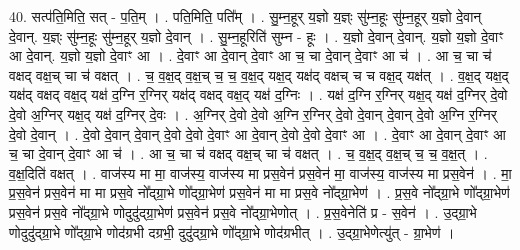 \documentclass[17pt]{extarticle}
\begin{document}
40. सत्प॑ति॒मिति॒ सत् - प॒ति॒म् । . पति॒मिति॒ पति᳚म् । . सु॒म्न॒हूर् य॒ज्ञो य॒ज्ञ्ः सु॑म्न॒हूः सु॑म्न॒हूर् य॒ज्ञो दे॒वान् दे॒वान्. य॒ज्ञ्ः सु॑म्न॒हूः सु॑म्न॒हूर् य॒ज्ञो दे॒वान् । . सु॒म्न॒हूरिति॑ सुम्न - हूः । . य॒ज्ञो दे॒वान् दे॒वान्. य॒ज्ञो य॒ज्ञो दे॒वाꣳ आ दे॒वान्. य॒ज्ञो य॒ज्ञो दे॒वाꣳ आ । . दे॒वाꣳ आ दे॒वान् दे॒वाꣳ आ च॒ चा दे॒वान् दे॒वाꣳ आ च॑ । . आ च॒ चा च॑ वक्षद् वक्ष॒च् चा च॑ वक्षत् । . च॒ व॒क्ष॒द् व॒क्ष॒च् च॒ च॒ व॒क्ष॒द् यक्ष॒द् यक्ष॑द् वक्षच् च च वक्ष॒द् यक्ष॑त् । . व॒क्ष॒द् यक्ष॒द् यक्ष॑द् वक्षद् वक्ष॒द् यक्ष॑ द॒ग्नि र॒ग्निर् यक्ष॑द् वक्षद् वक्ष॒द् यक्ष॑ द॒ग्निः । . यक्ष॑ द॒ग्नि र॒ग्निर् यक्ष॒द् यक्ष॑ द॒ग्निर् दे॒वो दे॒वो अ॒ग्निर् यक्ष॒द् यक्ष॑ द॒ग्निर् दे॒वः । . अ॒ग्निर् दे॒वो दे॒वो अ॒ग्नि र॒ग्निर् दे॒वो दे॒वान् दे॒वान् दे॒वो अ॒ग्नि र॒ग्निर् दे॒वो दे॒वान् । . दे॒वो दे॒वान् दे॒वान् दे॒वो दे॒वो दे॒वाꣳ आ दे॒वान् दे॒वो दे॒वो दे॒वाꣳ आ । . दे॒वाꣳ आ दे॒वान् दे॒वाꣳ आ च॒ चा दे॒वान् दे॒वाꣳ आ च॑ । . आ च॒ चा च॑ वक्षद् वक्ष॒च् चा च॑ वक्षत् । . च॒ व॒क्ष॒द् व॒क्ष॒च् च॒ च॒ व॒क्ष॒त् । . व॒क्ष॒दिति॑ वक्षत् । . वाज॑स्य मा मा॒ वाज॑स्य॒ वाज॑स्य मा प्रस॒वेन॑ प्रस॒वेन॑ मा॒ वाज॑स्य॒ वाज॑स्य मा प्रस॒वेन॑ । . मा॒ प्र॒स॒वेन॑ प्रस॒वेन॑ मा मा प्रस॒वे नो᳚द्ग्रा॒भे णो᳚द्ग्रा॒भेण॑ प्रस॒वेन॑ मा मा 
प्रस॒वे नो᳚द्ग्रा॒भेण॑ । . प्र॒स॒वे नो᳚द्ग्रा॒भे णो᳚द्ग्रा॒भेण॑ प्रस॒वेन॑ प्रस॒वे नो᳚द्ग्रा॒भे णोदुदु॑द्ग्रा॒भेण॑ प्रस॒वेन॑ 
प्रस॒वे नो᳚द्ग्रा॒भेणोत् । . प्र॒स॒वेनेति॑ प्र - स॒वेन॑ । . उ॒द्ग्रा॒भे णोदुदु॑द्ग्रा॒भे णो᳚द्ग्रा॒भे णोद॑ग्रभी दग्रभी॒ दुदु॑द्ग्रा॒भे णो᳚द्ग्रा॒भे णोद॑ग्रभीत् । . उ॒द्ग्रा॒भेणेत्यु॑त् - ग्रा॒भेण॑ । \newline
\end{document}
